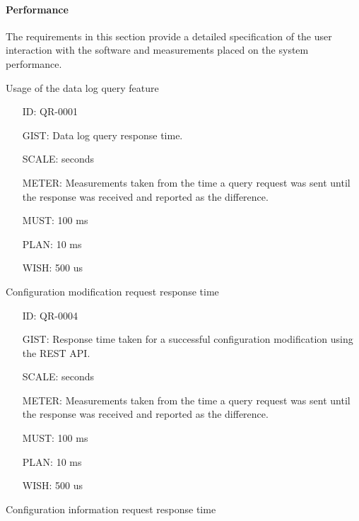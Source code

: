       \paragraph{Performance}

        The requirements in this section provide a detailed specification of
        the user interaction with the software and measurements placed on the
        system performance.

        Usage of the data log query feature

        \begin{itemize}
          \setlength{\itemindent}{.5in}
          \itemsep .15em
          \item[ID:] QR-0001
          \item[GIST:] Data log query response time.
          \item[SCALE:] seconds
          \item[METER:] Measurements taken from the time a query request was
            sent until the response was received and reported as the difference.
          \item[MUST:] 100 ms
          \item[PLAN:] 10 ms
          \item[WISH:] 500 us
        \end{itemize}

        Configuration modification request response time

        \begin{itemize}
          \setlength{\itemindent}{.5in}
          \itemsep .15em
          \item[ID:] QR-0004
          \item[GIST:] Response time taken for a successful configuration
            modification using the REST API.
          \item[SCALE:] seconds
          \item[METER:] Measurements taken from the time a query request was
            sent until the response was received and reported as the difference.
          \item[MUST:] 100 ms
          \item[PLAN:] 10 ms
          \item[WISH:] 500 us
        \end{itemize}

        Configuration information request response time

